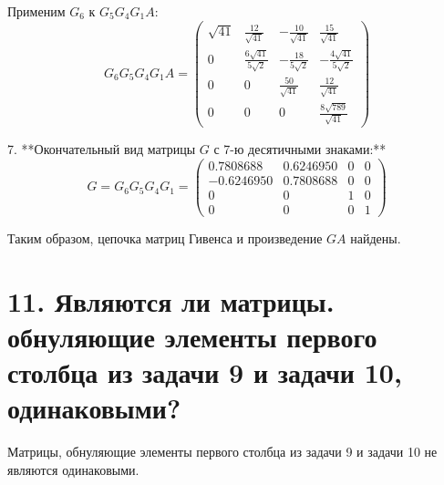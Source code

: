 \documentclass[a4paper,14pt]{article}
\begin{document}
   Применим \( G_6 \) к \( G_5 G_4 G_1 A \):
   \[
   G_6 G_5 G_4 G_1 A = \begin{pmatrix}
   \sqrt{41} & \frac{12}{\sqrt{41}} & -\frac{10}{\sqrt{41}} & \frac{15}{\sqrt{41}} \\
   0 & \frac{6 \sqrt{41}}{5 \sqrt{2}} & -\frac{18}{5 \sqrt{2}} & -\frac{4 \sqrt{41}}{5 \sqrt{2}} \\
   0 & 0 & \frac{50}{\sqrt{41}} & \frac{12}{\sqrt{41}} \\
   0 & 0 & 0 & \frac{8 \sqrt{789}}{\sqrt{41}}
   \end{pmatrix}
   \]

7. **Окончательный вид матрицы \( G \) с 7-ю десятичными знаками:**
   \[
   G = G_6 G_5 G_4 G_1 = \begin{pmatrix}
   0.7808688 & 0.6246950 & 0 & 0 \\
   -0.6246950 & 0.7808688 & 0 & 0 \\
   0 & 0 & 1 & 0 \\
   0 & 0 & 0 & 1
   \end{pmatrix}
   \]

Таким образом, цепочка матриц Гивенса и произведение \( GA \) найдены.

\section{11. Являются ли матрицы. обнуляющие элементы первого столбца из задачи 9 и задачи 10, одинаковыми?}

Матрицы, обнуляющие элементы первого столбца из задачи 9 и задачи 10 не являются одинаковыми.
\end{document}
